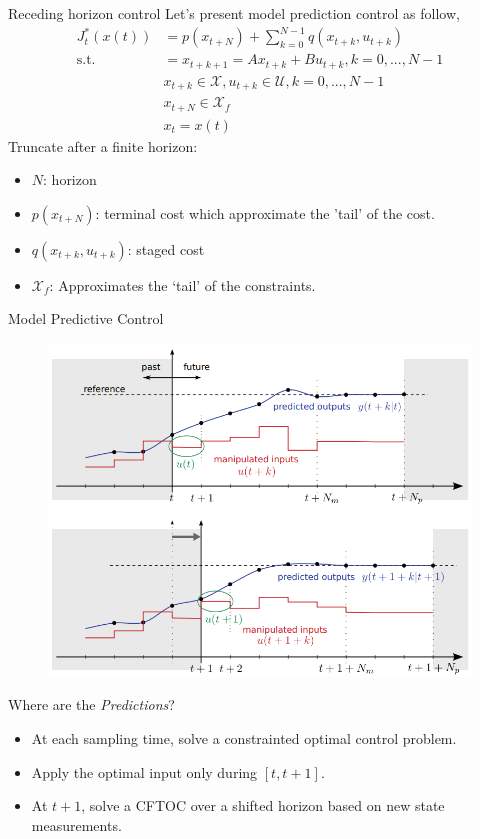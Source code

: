 \documentclass{beamer}
\begin{document}
\begin{frame}{Receding horizon control}
	Let's present model prediction control as follow,
	\begin{align*}
		J_t^*(x(t)) &= p(x_{t+N}) + \sum_{k = 0}^{N-1} q(x_{t+k}, u_{t+k}) \\
		\text{s.t.} &= x_{t+k+1} = A x_{t+k} + B u_{t+k}, k = 0,...,N-1 \\
		& x_{t+k} \in \mathcal{X}, u_{t+k} \in \mathcal{U}, k = 0,...,N-1 \\
		& x_{t+N} \in \mathcal{X}_f \\
		& x_t = x(t)
	\end{align*}
	Truncate after a finite horizon:
	\begin{itemize}
		\item $N$: horizon
		\item $p(x_{t+N})$: terminal cost which approximate the 'tail' of the cost.
		\item $q(x_{t+k}, u_{t+k})$: staged cost
		\item $\mathcal{X}_f$: Approximates the ‘tail’ of the constraints.
	\end{itemize}
\end{frame}

\begin{frame}{Model Predictive Control}
	\begin{figure}
		\includegraphics[width=0.5\linewidth]{figures/mpc-prediction.png}
	\end{figure}
	Where are the \emph{Predictions}?
	\begin{itemize}
		\item At each sampling time, solve a constrainted optimal control problem.
		\item Apply the optimal input only during $[t, t+1]$.
		\item At $t + 1$, solve a CFTOC over a shifted horizon based on new state measurements.
	\end{itemize}
\end{frame}
\end{document}

